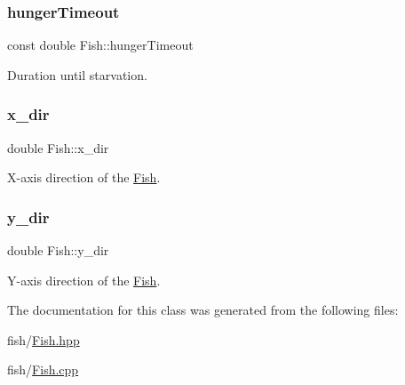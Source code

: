 \subsubsection{\texorpdfstring{hunger\+Timeout}{hungerTimeout}}
{\footnotesize\ttfamily const double Fish\+::hunger\+Timeout\hspace{0.3cm}{\ttfamily [protected]}}



Duration until starvation. 

\mbox{\label{class_fish_af2d14945a447d890696f16ac60a43b4a}} 
\subsubsection{\texorpdfstring{x\+\_\+dir}{x\_dir}}
{\footnotesize\ttfamily double Fish\+::x\+\_\+dir\hspace{0.3cm}{\ttfamily [protected]}}



X-\/axis direction of the \mbox{\hyperlink{class_fish}{Fish}}. 

\mbox{\label{class_fish_a5e9e0091482ec1bdf758fd5947564ac7}} 
\subsubsection{\texorpdfstring{y\+\_\+dir}{y\_dir}}
{\footnotesize\ttfamily double Fish\+::y\+\_\+dir\hspace{0.3cm}{\ttfamily [protected]}}



Y-\/axis direction of the \mbox{\hyperlink{class_fish}{Fish}}. 



The documentation for this class was generated from the following files\+:\begin{DoxyCompactItemize}
\item 
fish/\mbox{\hyperlink{_fish_8hpp}{Fish.\+hpp}}\item 
fish/\mbox{\hyperlink{_fish_8cpp}{Fish.\+cpp}}\end{DoxyCompactItemize}

